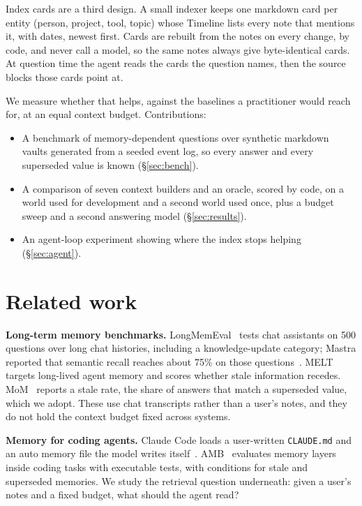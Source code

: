 \documentclass[11pt]{article}
\begin{document}
Index cards are a third design. A small indexer keeps one markdown card per entity (person, project, tool, topic)
whose Timeline lists every note that mentions it, with dates, newest first. Cards are rebuilt from the notes on
every change, by code, and never call a model, so the same notes always give byte-identical cards. At question time
the agent reads the cards the question names, then the source blocks those cards point at.

We measure whether that helps, against the baselines a practitioner would reach for, at an equal context budget.
Contributions:
\begin{itemize}
\item A benchmark of memory-dependent questions over synthetic markdown vaults generated from a seeded event log,
so every answer and every superseded value is known (\S\ref{sec:bench}).
\item A comparison of seven context builders and an oracle, scored by code, on a world used for development and a
second world used once, plus a budget sweep and a second answering model (\S\ref{sec:results}).
\item An agent-loop experiment showing where the index stops helping (\S\ref{sec:agent}).
\end{itemize}

\section{Related work}

\textbf{Long-term memory benchmarks.} LongMemEval~\cite{longmemeval} tests chat assistants on 500 questions over long
chat histories, including a knowledge-update category; Mastra reported that semantic recall reaches about 75\% on
those questions~\cite{mastra}. MELT~\cite{melt} targets long-lived agent memory and scores whether stale information
recedes. MoM~\cite{mom} reports a stale rate, the share of answers that match a superseded value, which we adopt.
These use chat transcripts rather than a user's notes, and they do not hold the context budget fixed across
systems.

\textbf{Memory for coding agents.} Claude Code loads a user-written \texttt{CLAUDE.md} and an auto memory file the
model writes itself~\cite{ccmemory}. AMB~\cite{amb} evaluates memory layers inside coding tasks with executable tests,
with conditions for stale and superseded memories. We study the retrieval question underneath: given a user's notes
and a fixed budget, what should the agent read?
\end{document}

